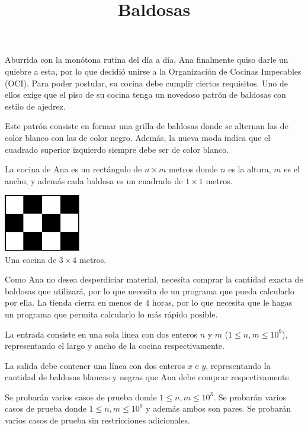 \documentclass{oci}
\title{Baldosas}
\begin{document}
\begin{problemDescription}
  Aburrida con la monótona rutina del día a día, Ana finalmente quiso darle un quiebre a esta, por lo que decidió unirse
  a la Organización de Cocinas Impecables (OCI). Para poder postular, su cocina debe cumplir ciertos requisitos. Uno de ellos
  exige que el piso de su cocina tenga un novedoso patrón de baldosas con estilo de ajedrez.

  Este patrón consiste en formar una grilla de baldosas donde se alternan las de color blanco con las de color negro. Además,
  la nueva moda indica que el cuadrado superior izquierdo siempre debe ser de color blanco.

  La cocina de Ana es un rectángulo de $n \times m$ metros donde $n$ es la altura, $m$ es el ancho, y además cada baldosa es un cuadrado de $1 \times 1$ metros.

  \begin{center}
    \includegraphics[width=0.25\textwidth]{example-checkerboard.pdf} \\
    Una cocina de $3 \times 4$ metros.
  \end{center}

  Como Ana no desea desperdiciar material, necesita comprar la cantidad exacta de baldosas que utilizará, por lo que necesita
  de un programa que pueda calcularlo por ella. La tienda cierra en menos de $4$ horas, por lo que necesita que le hagas un
  programa que permita calcularlo lo más rápido posible.
\end{problemDescription}

\begin{inputDescription}
  La entrada consiste en una sola línea con dos enteros $n$ y $m$ ($1 \leq n, m \leq 10^9$), representando el largo y
  ancho de la cocina respectivamente.
\end{inputDescription}

\begin{outputDescription}
  La salida debe contener una línea con dos enteros $x$ e $y$, representando la cantidad de baldosas blancas y negras que
  Ana debe comprar respectivamente.
\end{outputDescription}

\clearpage
\begin{scoreDescription}
   Se probarán varios casos de prueba donde $1 \leq n, m \leq 10^3$.
   Se probarán varios casos de prueba donde $1 \leq n, m \leq 10^9$ y además ambos son pares.
   Se probarán varios casos de prueba sin restricciones adicionales.
\end{scoreDescription}

\begin{sampleDescription}
\end{sampleDescription}
\end{document}
